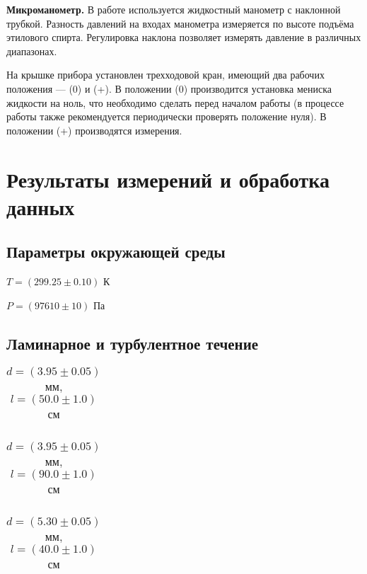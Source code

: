 \documentclass[a4paper,12pt]{article} %
\begin{document}
\textbf{Микроманометр.} В работе используется жидкостный манометр с наклонной трубкой. Разность давлений на входах манометра измеряется по высоте
подъёма этилового спирта. Регулировка
наклона позволяет измерять давление в различных диапазонах.

На крышке прибора установлен трехходовой кран, имеющий два рабочих
положения — (0) и (+). В положении (0) производится установка мениска жидкости на ноль, что необходимо сделать перед началом работы (в процессе работы также рекомендуется периодически проверять положение нуля). В положении (+) производятся измерения.
\newpage


\section{Результаты измерений и обработка данных}

\subsection*{Параметры окружающей среды}

$T=(299.25 \pm 0.10)$ К

$P=(97610 \pm 10)$ Па

\subsection*{Ламинарное и турбулентное течение}

\begin{table}[ht!]
\caption{$d=(3.95 \pm 0.05)$ мм, $l=(50.0 \pm 1.0)$ см}
\begin{tabular}{ cc }


\end{tabular}
\end{table}

\begin{table}[ht!]
\caption{$d=(3.95 \pm 0.05)$ мм, $l=(90.0 \pm 1.0)$ см}
\begin{tabular}{ cc }


\end{tabular}
\end{table}

\begin{table}[ht!]
\caption{$d=(5.30 \pm 0.05)$ мм, $l=(40.0 \pm 1.0)$ см}
\begin{tabular}{ cc }


\end{tabular}
\end{table}
\end{document}
